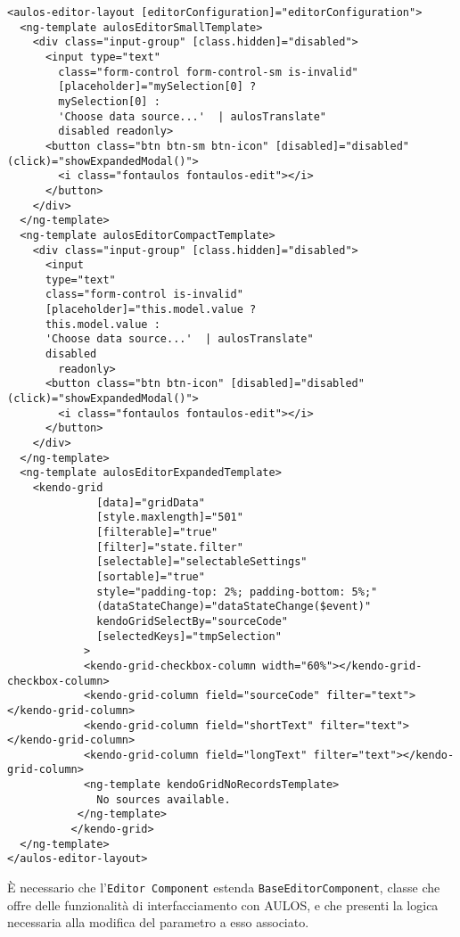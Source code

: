 \begin{lstlisting}[caption={source-editor.component.html},style=html]
<aulos-editor-layout [editorConfiguration]="editorConfiguration">
  <ng-template aulosEditorSmallTemplate>
    <div class="input-group" [class.hidden]="disabled">
      <input type="text" 
        class="form-control form-control-sm is-invalid"
        [placeholder]="mySelection[0] ? 
        mySelection[0] : 
        'Choose data source...'  | aulosTranslate" 
        disabled readonly>
      <button class="btn btn-sm btn-icon" [disabled]="disabled" (click)="showExpandedModal()">
        <i class="fontaulos fontaulos-edit"></i>
      </button>
    </div>
  </ng-template>
  <ng-template aulosEditorCompactTemplate>
    <div class="input-group" [class.hidden]="disabled">
      <input 
      type="text" 
      class="form-control is-invalid" 
      [placeholder]="this.model.value ? 
      this.model.value : 
      'Choose data source...'  | aulosTranslate" 
      disabled
        readonly>
      <button class="btn btn-icon" [disabled]="disabled" (click)="showExpandedModal()">
        <i class="fontaulos fontaulos-edit"></i>
      </button>
    </div>
  </ng-template>
  <ng-template aulosEditorExpandedTemplate>
    <kendo-grid
              [data]="gridData"
              [style.maxlength]="501"
              [filterable]="true"
              [filter]="state.filter"
              [selectable]="selectableSettings"
              [sortable]="true"
              style="padding-top: 2%; padding-bottom: 5%;"
              (dataStateChange)="dataStateChange($event)"
              kendoGridSelectBy="sourceCode"
              [selectedKeys]="tmpSelection"
            >
            <kendo-grid-checkbox-column width="60%"></kendo-grid-checkbox-column>
            <kendo-grid-column field="sourceCode" filter="text"></kendo-grid-column>
            <kendo-grid-column field="shortText" filter="text"></kendo-grid-column>
            <kendo-grid-column field="longText" filter="text"></kendo-grid-column>
            <ng-template kendoGridNoRecordsTemplate>
              No sources available.
           </ng-template>
          </kendo-grid>
  </ng-template>
</aulos-editor-layout>
\end{lstlisting}
È necessario che l'\verb|Editor Component| estenda \verb|BaseEditorComponent|, classe che offre delle funzionalità di interfacciamento con AULOS, e che presenti la logica necessaria alla modifica del parametro a esso associato.

